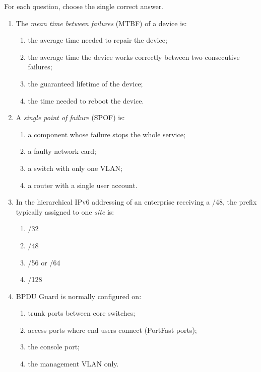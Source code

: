 \documentclass[11pt]{article}
\begin{document}
\begin{exercice}
For each question, choose the single correct answer.
\begin{enumerate}
\item The \emph{mean time between failures} (MTBF) of a device is:
\begin{enumerate}
\item the average time needed to repair the device;
\item the average time the device works correctly between two consecutive failures;
\item the guaranteed lifetime of the device;
\item the time needed to reboot the device.
\end{enumerate}
\item A \emph{single point of failure} (SPOF) is:
\begin{enumerate}
\item a component whose failure stops the whole service;
\item a faulty network card;
\item a switch with only one VLAN;
\item a router with a single user account.
\end{enumerate}
\item In the hierarchical IPv6 addressing of an enterprise receiving a /48, the prefix typically assigned to one \emph{site} is:
\begin{enumerate}
\item /32 \item /48 \item /56 or /64 \item /128
\end{enumerate}
\item BPDU Guard is normally configured on:
\begin{enumerate}
\item trunk ports between core switches;
\item access ports where end users connect (PortFast ports);
\item the console port;
\item the management VLAN only.
\end{enumerate}
\end{enumerate}
\end{exercice}
\end{document}
